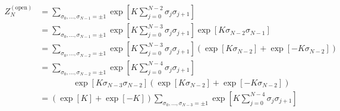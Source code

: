 \documentclass[12pt,b5paper]{ltjsarticle}
\begin{document}
\begin{enumerate}
\begin{enumerate}



            \begin{align}
             Z^{(\mathrm{open})}_{N}
              &= \sum_{\sigma_{0},\dots,\sigma_{N-1} = \pm 1}
                \exp \left[
                    K \sum_{j=0}^{N-2}\sigma_{j}\sigma_{j+1}
                    \right]\\
              &= \sum_{\sigma_{0},\dots,\sigma_{N-1} = \pm 1}
                \exp \left[
                    K \sum_{j=0}^{N-3}\sigma_{j}\sigma_{j+1}
                    \right]
                \exp \left[
                    K \sigma_{N-2}\sigma_{N-1}
                    \right]\\
              &= \sum_{\sigma_{0},\dots,\sigma_{N-2} = \pm 1}
                \exp \left[
                    K \sum_{j=0}^{N-3}\sigma_{j}\sigma_{j+1}
                    \right] \left(
                      \exp \left[K \sigma_{N-2} \right]
                        +\exp \left[-K \sigma_{N-2} \right]
                    \right)\\
              &= \sum_{\sigma_{0},\dots,\sigma_{N-2} = \pm 1}
                \exp \left[
                    K \sum_{j=0}^{N-4}\sigma_{j}\sigma_{j+1}
                    \right] \nonumber\\
                & \qquad\qquad \exp \left[
                    K \sigma_{N-3}\sigma_{N-2}
                    \right]
                    \left(
                      \exp \left[K \sigma_{N-2} \right]
                        +\exp \left[-K \sigma_{N-2} \right]
                    \right)\\
              &= (\exp [K]+\exp [-K])
                \sum_{\sigma_{0},\dots,\sigma_{N-3} = \pm 1}
                \exp \left[
                    K \sum_{j=0}^{N-4}\sigma_{j}\sigma_{j+1}
                    \right]\nonumber\\

\end{align}
\end{enumerate}
\end{enumerate}
\end{document}
